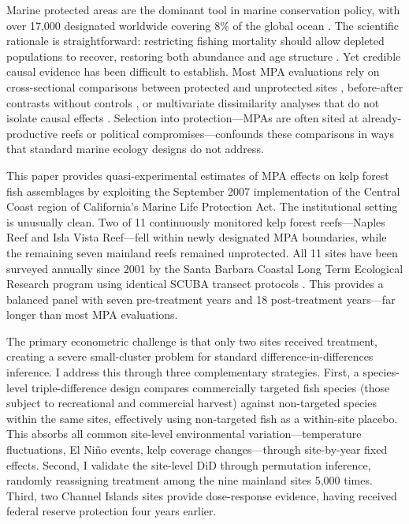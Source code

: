 \documentclass[12pt]{article}
\begin{document}
Marine protected areas are the dominant tool in marine conservation policy, with over 17,000 designated worldwide covering 8\% of the global ocean \citep{edgar2014global}. The scientific rationale is straightforward: restricting fishing mortality should allow depleted populations to recover, restoring both abundance and age structure \citep{lester2009biological, halpern2003effect}. Yet credible causal evidence has been difficult to establish. Most MPA evaluations rely on cross-sectional comparisons between protected and unprotected sites \citep{halpern2002marine}, before-after contrasts without controls \citep{babcock2010decadal}, or multivariate dissimilarity analyses that do not isolate causal effects \citep{caselle2015recovery}. Selection into protection---MPAs are often sited at already-productive reefs or political compromises---confounds these comparisons in ways that standard marine ecology designs do not address.

This paper provides quasi-experimental estimates of MPA effects on kelp forest fish assemblages by exploiting the September 2007 implementation of the Central Coast region of California's Marine Life Protection Act. The institutional setting is unusually clean. Two of 11 continuously monitored kelp forest reefs---Naples Reef and Isla Vista Reef---fell within newly designated MPA boundaries, while the remaining seven mainland reefs remained unprotected. All 11 sites have been surveyed annually since 2001 by the Santa Barbara Coastal Long Term Ecological Research program using identical SCUBA transect protocols \citep{reed2016sbc}. This provides a balanced panel with seven pre-treatment years and 18 post-treatment years---far longer than most MPA evaluations.

The primary econometric challenge is that only two sites received treatment, creating a severe small-cluster problem for standard difference-in-differences inference. I address this through three complementary strategies. First, a species-level triple-difference design compares commercially targeted fish species (those subject to recreational and commercial harvest) against non-targeted species within the same sites, effectively using non-targeted fish as a within-site placebo. This absorbs all common site-level environmental variation---temperature fluctuations, El Ni\~no events, kelp coverage changes---through site-by-year fixed effects. Second, I validate the site-level DiD through permutation inference, randomly reassigning treatment among the nine mainland sites 5,000 times. Third, two Channel Islands sites provide dose-response evidence, having received federal reserve protection four years earlier.
\end{document}
